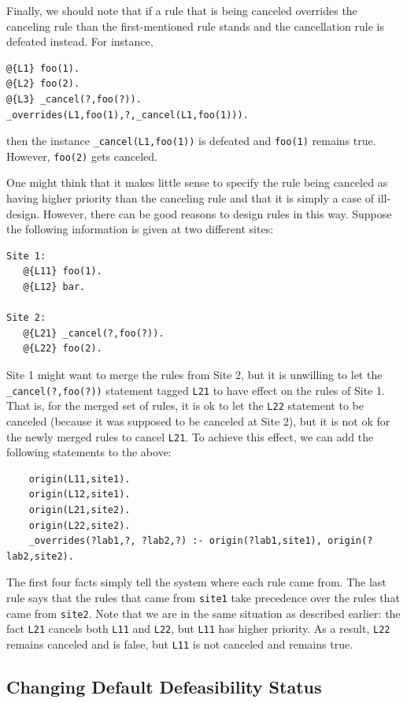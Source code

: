 \documentclass[11pt]{article}
\begin{document}
Finally, we should note that if a rule that is being canceled overrides
the canceling rule than the first-mentioned rule stands and the
cancellation rule is defeated instead. For instance,
\begin{verbatim}
@{L1} foo(1).
@{L2} foo(2).
@{L3} _cancel(?,foo(?)).  
_overrides(L1,foo(1),?,_cancel(L1,foo(1))).
\end{verbatim}
then the instance {\tt \_cancel(L1,foo(1))} is defeated and {\tt foo(1)}
remains true. However, {\tt foo(2)} gets canceled.

One might think that it makes little sense to specify the rule being
canceled as having higher priority than the canceling rule and that it is
simply a case of ill-design. However, there can be good reasons to design
rules in this way. Suppose the following information is given at two different sites:
\begin{verbatim}
Site 1:
   @{L11} foo(1).
   @{L12} bar.

Site 2:
   @{L21} _cancel(?,foo(?)).  
   @{L22} foo(2).
\end{verbatim}
Site 1 might want to merge the rules from Site 2, but it is unwilling to
let the {\tt \_cancel(?,foo(?))} statement tagged {\tt L21} to have effect
on the rules of Site 1. That is, for the merged set of rules, it is ok to
let the {\tt L22} statement to be canceled (because it was supposed to be
canceled at Site 2), but it is not ok for the newly merged rules to cancel
{\tt L21}. To achieve this effect, we can add the following statements to
the above:
\begin{verbatim}
    origin(L11,site1).
    origin(L12,site1).
    origin(L21,site2).
    origin(L22,site2).
    _overrides(?lab1,?, ?lab2,?) :- origin(?lab1,site1), origin(?lab2,site2).
\end{verbatim}
The first four facts simply tell the system where each rule came from.  The
last rule says that the rules that came from {\tt site1} take precedence
over the rules that came from {\tt site2}.  Note that we are in the same
situation as described earlier: the fact {\tt L21} cancels both {\tt L11}
and {\tt L22}, but {\tt L11} has higher priority. As a result, {\tt L22}
remains canceled and is false, but {\tt L11} is not canceled and remains
true.

\subsection{Changing  Default Defeasibility Status}
\end{document}
